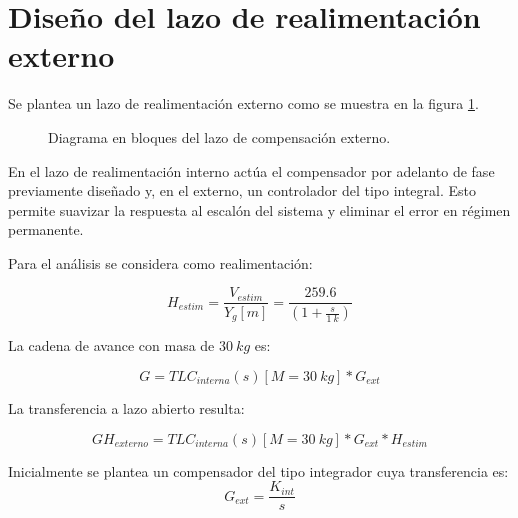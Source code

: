 %
%

\section{Diseño del lazo de realimentación externo}

\noindent Se plantea un lazo de realimentación externo como se muestra en la figura \ref{fig:diag-externo}. 

\begin{figure}[H]
	\centering
	
	\caption{Diagrama en bloques del lazo de compensación externo.}	\label{fig:diag-externo}
\end{figure}

En el lazo de realimentación interno actúa el compensador por adelanto de fase previamente diseñado y, en el externo, un controlador del tipo integral. Esto permite suavizar la respuesta al escalón del sistema y eliminar el error en régimen permanente.


\noindent Para el an\'{a}lisis se considera como realimentaci\'{o}n: 

\[H_{estim}=\frac{V_{estim}}{Y_g[m]}= \frac{259.6}{(1 + \frac{s}{1\:k})
}\] 

\noindent La cadena de avance con masa de $30\:kg$ es:

\begin{equation} \label{eq_cadena_avance_integrador}
	G=TLC_{interna}(s)[M=30\:kg]*G_{ext}
\end{equation}

La transferencia a lazo abierto resulta:

\begin{equation} \label{eq_lazo_abierto_externo}
	GH_{externo}=TLC_{interna}(s)[M=30\:kg]*G_{ext}*H_{estim}
\end{equation}

Inicialmente se plantea un compensador del tipo integrador cuya transferencia es:
\begin{equation}
	G_{ext}= \frac{K_{int}}{s}
\end{equation}


